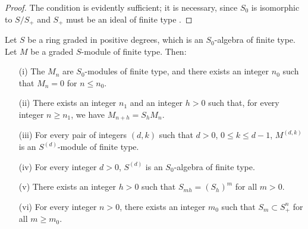 \begin{proof}
The condition is evidently sufficient;
it is necessary, since $S_0$ is isomorphic to $S/S_+$ and $S_+$ must be an ideal of finite type .
\end{proof}

\begin{lemma}[2.1.6]
\label{II.2.1.6}
Let $S$ be a ring graded in positive degrees, which is an $S_0$-algebra of finite type.
Let $M$ be a graded $S$-module of finite type.
Then:
\begin{enumerate}
  \item[{\rm(i)}] The $M_n$ are $S_0$-modules of finite type, and there exists an integer $n_0$ such that $M_n=0$ for $n\leq n_0$.
  \item[{\rm(ii)}] There exists an integer $n_1$ and an integer $h>0$ such that, for every integer $n\geq n_1$, we have $M_{n+h}=S_h M_n$.
  \item[{\rm(iii)}] For every pair of integers $(d,k)$ such that $d>0$, $0\leq k\leq d-1$, $M^{(d,k)}$ is an $S^{(d)}$-module of finite type.
  \item[{\rm(iv)}] For every integer $d>0$, $S^{(d)}$ is an $S_0$-algebra of finite type.
  \item[{\rm(v)}] There exists an integer $h>0$ such that $S_{mh}=(S_h)^m$ for all $m>0$.
  \item[{\rm(vi)}] For every integer $n>0$, there exists an integer $m_0$ such that $S_m\subset S_+^n$ for all $m\geq m_0$.
\end{enumerate}
\end{lemma}

